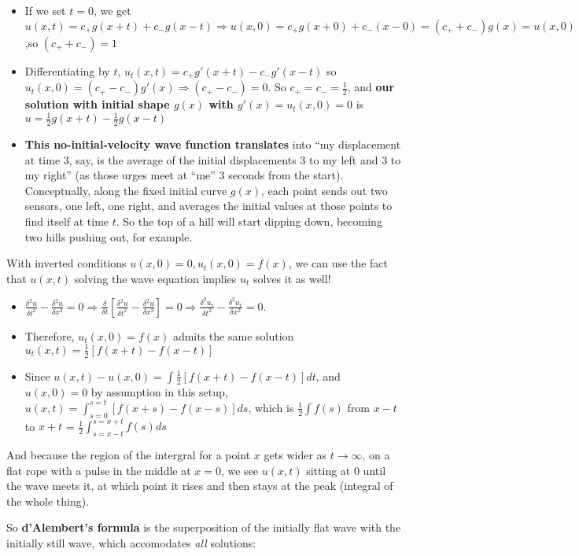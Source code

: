 \documentclass[11pt, oneside]{article}   	%
\begin{document}
\begin{itemize}
\item  If we set $t=0$, we get  $u(x,t) = c_+g(x+t)+c_-g(x-t) \Rightarrow u(x,0) = c_+g(x+0) + c_-(x-0) = (c_+ + c_-)g(x) = u(x,0)$ ,so $(c_+ + c_-) = 1$
\item Differentiating by $t$, $u_t(x,t) = c_+g'(x+t) - c_-g'(x-t)$ so $u_t(x,0) = (c_+ - c_-)g'(x) \Rightarrow (c_+ - c_-) = 0$.  So $c_+ = c_- = \frac{1}{2}$, and \textbf{our solution with initial shape $g(x)$ with $g'(x) = u_t(x, 0) = 0$} is $u = \frac{1}{2}g(x+t) - \frac{1}{2}g(x-t)$
\item \textbf{This no-initial-velocity wave function translates} into ``my displacement at time 3, say, is the average of the initial displacements 3 to my left and 3 to my right'' (as those urges meet at ``me'' 3 seconds from the start).  Conceptually, along the fixed initial curve $g(x)$, each point  sends out two sensors, one left, one right, and averages the initial values at those points to find itself at time $t$. So the top of a hill will start dipping down, becoming two hills pushing out, for example.
\end{itemize}

With inverted conditions $u(x, 0) = 0, u_t(x,0) = f(x)$, we can use the fact that $u(x,t)$ solving the wave equation implies $u_t$ solves it as well!

\begin{itemize}
\item  $\frac{\delta^2u}{\delta t^2} - \frac{\delta^2u}{\delta x^2} = 0 \Rightarrow \frac{\delta}{\delta t}[\frac{\delta^2u}{\delta t^2} - \frac{\delta^2u}{\delta x^2}] = 0 \Rightarrow  \frac{\delta^2u_t}{\delta t^2} - \frac{\delta^2u_t}{\delta x^2}  = 0$.
\item Therefore, $u_t(x,0) = f(x)$ admits the same solution $u_t(x,t) = \frac{1}{2} [f(x+t) - f(x-t)]$
\item Since $u(x,t) - u(x,0)  = \int  \frac{1}{2} [f(x+t) - f(x-t)]dt$, and $u(x,0) =  0$ by assumption in this setup, 
$u(x,t) = \int_{s=0}^{s=t} [f(x+s) - f(x-s)]ds$, which is $\frac{1}{2} \int f(s)$ from $x-t$ to $x+t$  = $\frac{1}{2}\int_{s=x-t}^{s=x+t} f(s)ds$
\end{itemize}

And because the region of the intergral for a point $x$ gets wider as $t \rightarrow \infty$, on a flat rope with a pulse in the middle at $x=0$, we see $u(x,t)$ sitting at $0$ until the wave meets it, at which point it rises and then stays at the peak (integral of the whole thing).

So \textbf{d'Alembert's formula} is the superposition of the initially flat wave with the initially still wave, which accomodates \emph{all} solutions:
\end{document}
